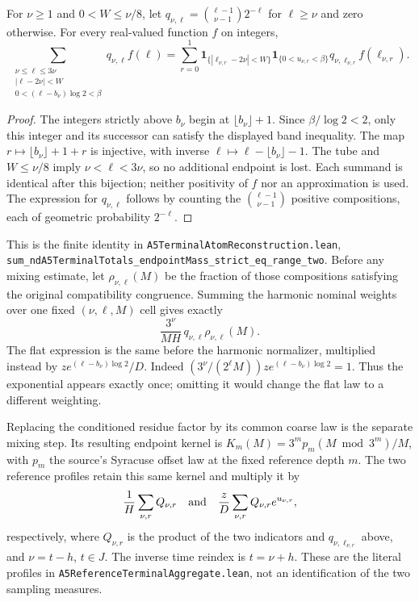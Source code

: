 \begin{proposition}
\label{prop:Mazur-two-rows}
For $\nu\ge1$ and $0<W\le\nu/8$, let
$q_{\nu,\ell}=\binom{\ell-1}{\nu-1}2^{-\ell}$ for $\ell\ge\nu$
and zero otherwise. For every real-valued function $f$ on integers,
\[
 \sum_{\substack{\nu\le\ell\le3\nu\\|\ell-2\nu|<W\\
              0<(\ell-b_\nu)\log2<\beta}}
      q_{\nu,\ell}f(\ell)
 =
 \sum_{r=0}^1
 \mathbf1_{\{|\ell_{\nu,r}-2\nu|<W\}}
 \mathbf1_{\{0<u_{\nu,r}<\beta\}}
 q_{\nu,\ell_{\nu,r}}f(\ell_{\nu,r}).
\]
\end{proposition}
\begin{proof}
The integers strictly above $b_\nu$ begin at
$\lfloor b_\nu\rfloor+1$. Since $\beta/\log2<2$, only this
integer and its successor can satisfy the displayed band inequality.
The map $r\mapsto\lfloor b_\nu\rfloor+1+r$ is injective, with
inverse $\ell\mapsto\ell-\lfloor b_\nu\rfloor-1$.
The tube and $W\le\nu/8$ imply $\nu<\ell<3\nu$, so no
additional endpoint is lost. Each summand is identical after this
bijection; neither positivity of $f$ nor an approximation is used.
The expression for $q_{\nu,\ell}$ follows by counting the
$\binom{\ell-1}{\nu-1}$ positive compositions, each of geometric
probability $2^{-\ell}$.
\end{proof}

This is the finite identity in
\texttt{A5TerminalAtomReconstruction.lean},
\texttt{sum\_ndA5TerminalTotals\_endpointMass\_strict\_eq\_range\_two}.
Before any mixing estimate, let $\rho_{\nu,\ell}(M)$ be the fraction
of those compositions satisfying the original compatibility congruence.
Summing the harmonic nominal weights over one fixed $(\nu,\ell,M)$
cell gives exactly
\[
 \frac{3^\nu}{MH}\,q_{\nu,\ell}\rho_{\nu,\ell}(M).
\]
The flat expression is the same before the harmonic normalizer,
multiplied instead by $z e^{(\ell-b_\nu)\log2}/D$.
Indeed $(3^\nu/(2^\ell M))ze^{(\ell-b_\nu)\log2}=1$.
Thus the exponential appears exactly once; omitting it would change
the flat law to a different weighting.

Replacing the conditioned residue factor by its common coarse law
is the separate mixing step. Its resulting endpoint kernel is
$K_m(M)=3^m p_m(M\bmod3^m)/M$, with $p_m$ the source's
Syracuse offset law at the fixed reference depth $m$.
The two reference profiles retain this same kernel and multiply it by
\[
 \frac1H\sum_{\nu,r}Q_{\nu,r}
 \quad\hbox{and}\quad
 \frac zD\sum_{\nu,r}Q_{\nu,r}e^{u_{\nu,r}},
\]
respectively, where $Q_{\nu,r}$ is the product of the two indicators
and $q_{\nu,\ell_{\nu,r}}$ above, and $\nu=t-h$, $t\in J$.
The inverse time reindex is $t=\nu+h$. These are the literal
profiles in \texttt{A5ReferenceTerminalAggregate.lean}, not an
identification of the two sampling measures.

